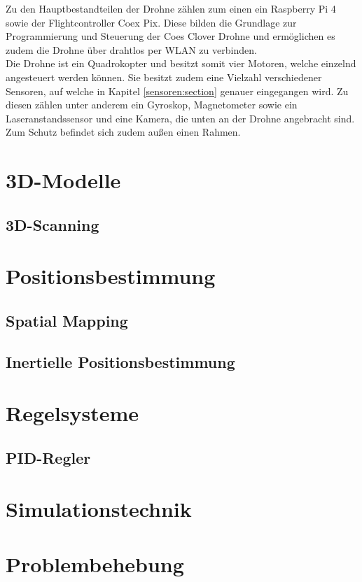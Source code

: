 Zu den Hauptbestandteilen der Drohne zählen zum einen ein Raspberry Pi 4 sowie der Flightcontroller Coex Pix. Diese bilden die Grundlage zur Programmierung und Steuerung der Coes Clover Drohne und ermöglichen es zudem die Drohne über drahtlos per WLAN zu verbinden. \\
Die Drohne ist ein Quadrokopter und besitzt somit vier Motoren, welche einzelnd angesteuert werden können. Sie besitzt zudem eine Vielzahl verschiedener Sensoren, auf welche in Kapitel \ref{sensoren:section} genauer eingegangen wird. Zu diesen zählen unter anderem ein Gyroskop, Magnetometer sowie ein Laseranstandssensor und eine Kamera, die unten an der Drohne angebracht sind.
Zum Schutz befindet sich zudem außen einen Rahmen.



\section{3D-Modelle} \label{3d-modelle:section}

    \subsection{3D-Scanning} \label{3d-scanning:subsection}

\section{Positionsbestimmung} \label{positionsbestimmung:section}

    \subsection{Spatial Mapping} \label{spatial_mapping:subsection}

    \subsection{Inertielle Positionsbestimmung} \label{inertielle_positionsbestimmung:subsection}

\section{Regelsysteme} \label{regelsysteme:section}

    \subsection{PID-Regler} \label{pid_regler:subsection}

\section{Simulationstechnik} \label{simulationstechnik:section}

\section{Problembehebung} \label{problembehebung:section}
